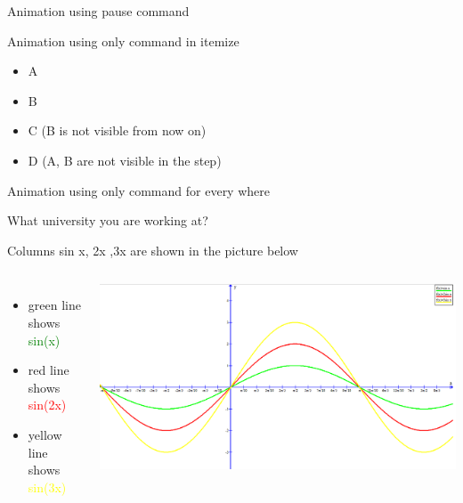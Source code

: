 \documentclass{beamer}
\begin{document}
{\begin{frame}[t]{Animation using pause command}
\end{frame}


\begin{frame}[t]{Animation using only command in itemize} \vspace*{10pt}

\begin{itemize}
	\item<1-3> A
	\item<2> B
	\item<3-> C (B is not visible from now on)
	\item<4> D (A, B are not visible in the step)
\end{itemize}

\end{frame}


\begin{frame}[t]{Animation using only command for every where} \vspace*{10pt}

What university you are working at? 

\end{frame}

\begin{frame}[t]{Columns}
sin x, 2x ,3x are shown in the picture below
\vspace*{20pt}
\begin{columns}

\begin{itemize}
	\item<2-> green line shows \textcolor{green}{sin(x)}
	\item<3-> red line shows \textcolor{red}{sin(2x)}
	\item<4-> yellow line shows \textcolor{yellow}{sin(3x)}
\end{itemize}

\includegraphics[scale=0.15]{sinx_2x_3x.png}
\end{columns}
\end{frame}

}
\end{document}
